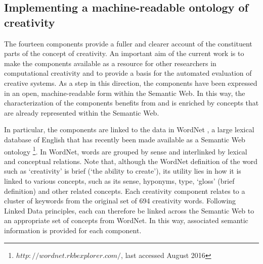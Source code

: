 \documentclass[10pt,letterpaper]{article}
\begin{document}
\subsection*{Implementing a machine-readable ontology of creativity}\label{creativityOntology}

The fourteen components provide a fuller and clearer account of the constituent parts of the concept of creativity. An important aim of the current work is to make the components available as a resource for other researchers in computational creativity and to provide a basis for the automated evaluation of creative systems. As a step in this direction, the components have been expressed in an open, machine-readable form within the Semantic Web. In this way, the characterization of the components benefits from and is enriched by concepts that are already represented within the Semantic Web. %

In particular, the components are linked to the data in WordNet \cite{fellbaum98}, a large lexical database of English that has recently been made available as a Semantic Web ontology \footnote{$http://wordnet.rkbexplorer.com/$, last accessed August 2016}. In WordNet, words are grouped by sense and interlinked by lexical and conceptual relations. Note that, although the WordNet definition of the word such as `creativity' is brief (`the ability to create'), its utility lies in how it is linked to various concepts, such as its sense, hyponyms, type, `gloss' (brief definition) and other related concepts. Each creativity component relates to a cluster of keywords from the original set of 694 creativity words. Following Linked Data principles, each can therefore be linked across the Semantic Web to an appropriate set of concepts from WordNet. In this way,  associated semantic information is provided for each component. 
\end{document}
